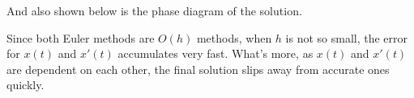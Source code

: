 \documentclass[11pt]{article}
\begin{document}
And also shown below is the phase diagram of the solution.
\begin{figure}[H]
	\centering
	
\end{figure}
Since both Euler methods are $O(h)$ methods, when $h$ is not so small, the error for $x(t)$ and $x'(t)$ accumulates very fast. What's more, as $x(t)$ and $x'(t)$ are dependent on each other, the final solution slips away from accurate ones quickly.
\end{document}
